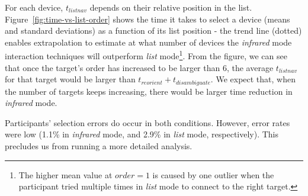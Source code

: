For each device, $t_{listnav}$ depends on their relative position in the list. Figure~\ref{fig:time-vs-list-order} shows the time it takes to select a device (means and standard deviations) as a function of its list position - the trend line (dotted) enables extrapolation to estimate at what number of devices the {\em infrared} mode interaction techniques will outperform {\em list} mode\footnote{The higher mean value at $order=1$ is caused by one outlier when the participant tried multiple times in {\em list} mode to connect to the right target.}. From the figure, we can see that once the target's order has increased to be larger than 6, the average $t_{listnav}$ for that target would be larger than $t_{reorient} + t_{disambiguate}$. We expect that, when the number of targets keeps increasing, there would be larger time reduction in {\em infrared} mode.


Participants' selection errors do occur in both conditions. However, error rates were low (1.1\% in {\em infrared} mode, and 2.9\% in {\em list} mode, respectively). This precludes us from running a more detailed analysis. 





